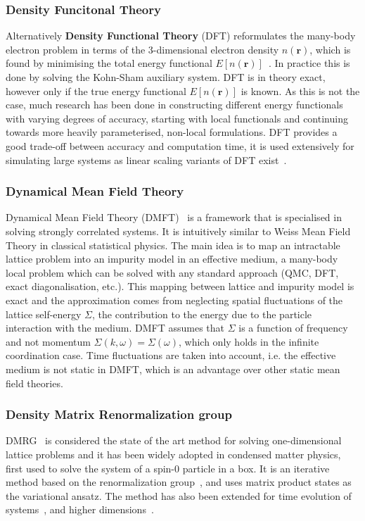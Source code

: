 \subsubsection{Density Funcitonal Theory}
Alternatively \textbf{Density Functional Theory} (DFT) reformulates the many-body electron problem in terms of the $3$-dimensional electron density $n(\mathbf{r})$, which is found by minimising the total energy functional $E[n(\mathbf{r})]$~\cite{hohenberg1964inhomogeneous}. In practice this is done by solving the Kohn-Sham auxiliary system. DFT is in theory exact, however only if the true energy functional $E[n(\mathbf{r})]$ is known. As this is not the case, much research has been done in constructing different energy functionals with varying degrees of accuracy, starting with local functionals and continuing towards more heavily parameterised, non-local formulations. DFT provides a good trade-off between accuracy and computation time, it is used extensively for simulating large systems as linear scaling variants of DFT exist~\cite{skylaris2005introducing}. 

\subsubsection{Dynamical Mean Field Theory}
Dynamical Mean Field Theory (DMFT)~\cite{held2007electronic} is a framework that is specialised in solving strongly correlated systems. It is intuitively similar to Weiss Mean Field Theory in classical statistical physics. The main idea is to map an intractable lattice problem into an impurity model in an effective medium, a many-body local problem which can be solved with any standard approach (QMC, DFT, exact diagonalisation, etc.). This mapping between lattice and impurity model is exact and the approximation comes from neglecting spatial fluctuations of the lattice self-energy $\Sigma$, the contribution to the energy due to the particle interaction with the medium. DMFT assumes that $\Sigma$ is a function of frequency and not momentum $\Sigma(k, \omega) = \Sigma(\omega)$, which only holds in the infinite coordination case. Time fluctuations are taken into account, i.e. the effective medium is not static in DMFT, which is an advantage over other static mean field theories. 

\subsubsection{Density Matrix Renormalization group}
DMRG~\cite{white1992density} is considered the state of the art method for solving one-dimensional lattice problems and it has been widely adopted in condensed matter physics, first used to solve the system of a spin-0 particle in a box. It is an iterative method based on the renormalization group~\cite{wilson1975renormalization}, and uses matrix product states as the variational ansatz. The method has also been extended for time evolution of systems~\cite{feiguin2005time}, and higher dimensions~\cite{verstraete2004renormalization}.

